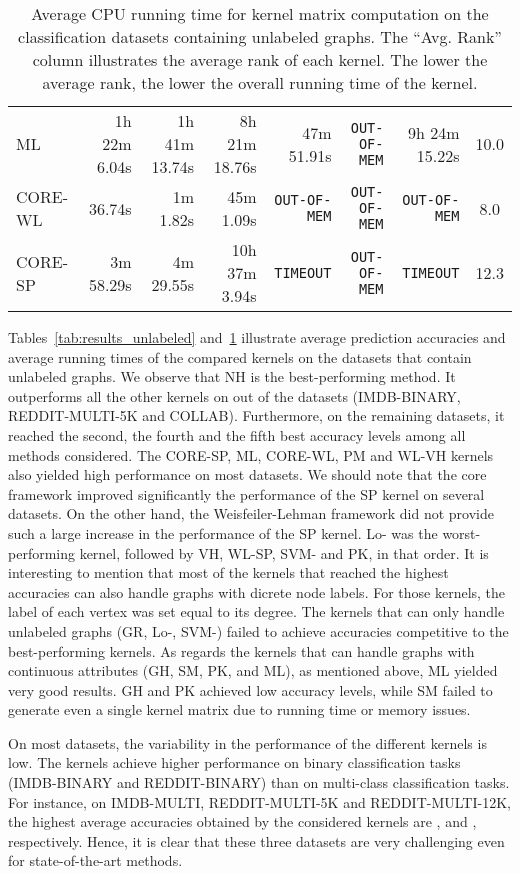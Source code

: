 \documentclass[twoside,11pt]{article}
\begin{document}
\begin{table}[t]
\begin{sc}
{\begin{tabular}{lrrrrrrc}
ML & 1h 22m 6.04s & 1h 41m 13.74s & 8h 21m 18.76s & 47m 51.91s & \texttt{OUT-OF-MEM} & 9h 24m 15.22s & 10.0 \\ 
CORE-WL & 36.74s & 1m 1.82s & 45m 1.09s & \texttt{OUT-OF-MEM} & \texttt{OUT-OF-MEM} & \texttt{OUT-OF-MEM} & 8.0 \\ 
CORE-SP & 3m 58.29s & 4m 29.55s & 10h 37m 3.94s & \texttt{TIMEOUT} & \texttt{OUT-OF-MEM} & \texttt{TIMEOUT} & 12.3 \\ 
\hline
\end{tabular}
}
\end{sc}
\caption{Average CPU running time for kernel matrix computation on the  classification datasets containing unlabeled graphs. The ``Avg. Rank'' column illustrates the average rank of each kernel. The lower the average rank, the lower the overall running time of the kernel.}
\label{tab:runtimes_unlabeled}
\end{table}

Tables~\ref{tab:results_unlabeled} and~\ref{tab:runtimes_unlabeled} illustrate average prediction accuracies and average running times of the compared kernels on the  datasets that contain unlabeled graphs.
We observe that NH is the best-performing method.
It outperforms all the other kernels on  out of the  datasets (IMDB-BINARY, REDDIT-MULTI-5K and COLLAB).
Furthermore, on the remaining datasets, it reached the second, the fourth and the fifth best accuracy levels among all methods considered.
The CORE-SP, ML, CORE-WL, PM and WL-VH kernels also yielded high performance on most datasets.
We should note that the core framework improved significantly the performance of the SP kernel on several datasets.
On the other hand, the Weisfeiler-Lehman framework did not provide such a large increase in the performance of the SP kernel.
Lo- was the worst-performing kernel, followed by VH, WL-SP, SVM- and PK, in that order.
It is interesting to mention that most of the kernels that reached the highest accuracies can also handle graphs with dicrete node labels.
For those kernels, the label of each vertex was set equal to its degree.
The kernels that can only handle unlabeled graphs (GR, Lo-, SVM-) failed to achieve accuracies competitive to the best-performing kernels.
As regards the kernels that can handle graphs with continuous attributes (GH, SM, PK, and ML), as mentioned above, ML yielded very good results.
GH and PK achieved low accuracy levels, while SM failed to generate even a single kernel matrix due to running time or memory issues.

On most datasets, the variability in the performance of the different kernels is low.
The kernels achieve higher performance on binary classification tasks (IMDB-BINARY and REDDIT-BINARY) than on multi-class classification tasks.
For instance, on IMDB-MULTI, REDDIT-MULTI-5K and REDDIT-MULTI-12K, the highest average accuracies obtained by the considered kernels are ,  and , respectively.
Hence, it is clear that these three datasets are very challenging even for state-of-the-art methods.
\end{document}
